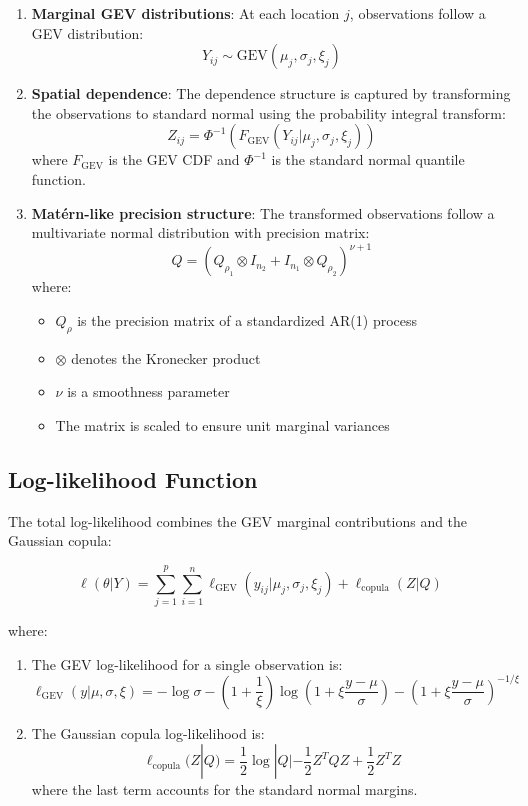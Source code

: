 \documentclass[
  letterpaper,
  DIV=11,
  numbers=noendperiod]{scrartcl}
\providecommand{\tightlist}{%
  \setlength{\itemsep}{0pt}\setlength{\parskip}{0pt}}\usepackage{longtable,booktabs,array}
\begin{document}
\begin{enumerate}
\def\labelenumi{\arabic{enumi}.}
\item
  \textbf{Marginal GEV distributions}: At each location \(j\),
  observations follow a GEV distribution:
  \[Y_{ij} \sim \text{GEV}(\mu_j, \sigma_j, \xi_j)\]
\item
  \textbf{Spatial dependence}: The dependence structure is captured by
  transforming the observations to standard normal using the probability
  integral transform:
  \[Z_{ij} = \Phi^{-1}(F_{\text{GEV}}(Y_{ij}|\mu_j,\sigma_j,\xi_j))\]
  where \(F_{\text{GEV}}\) is the GEV CDF and \(\Phi^{-1}\) is the
  standard normal quantile function.
\item
  \textbf{Matérn-like precision structure}: The transformed observations
  follow a multivariate normal distribution with precision matrix:
  \[Q = (Q_{\rho_1} \otimes I_{n_2} + I_{n_1} \otimes Q_{\rho_2})^{\nu+1}\]
  where:

  \begin{itemize}
  \tightlist
  \item
    \(Q_{\rho}\) is the precision matrix of a standardized AR(1) process
  \item
    \(\otimes\) denotes the Kronecker product
  \item
    \(\nu\) is a smoothness parameter
  \item
    The matrix is scaled to ensure unit marginal variances
  \end{itemize}
\end{enumerate}

\subsection{Log-likelihood Function}\label{log-likelihood-function}

The total log-likelihood combines the GEV marginal contributions and the
Gaussian copula:

\[\ell(\theta|Y) = \sum_{j=1}^p \sum_{i=1}^n \ell_{\text{GEV}}(y_{ij}|\mu_j,\sigma_j,\xi_j) + \ell_{\text{copula}}(Z|Q)\]

where:

\begin{enumerate}
\def\labelenumi{\arabic{enumi}.}
\item
  The GEV log-likelihood for a single observation is:
  \[\ell_{\text{GEV}}(y|\mu,\sigma,\xi) = -\log\sigma - (1+\frac{1}{\xi})\log(1+\xi\frac{y-\mu}{\sigma}) - (1+\xi\frac{y-\mu}{\sigma})^{-1/\xi}\]
\item
  The Gaussian copula log-likelihood is:
  \[\ell_{\text{copula}}(Z|Q) = \frac{1}{2}\log|Q| - \frac{1}{2}Z^TQZ + \frac{1}{2}Z^TZ\]
  where the last term accounts for the standard normal margins.
\end{enumerate}
\end{document}
